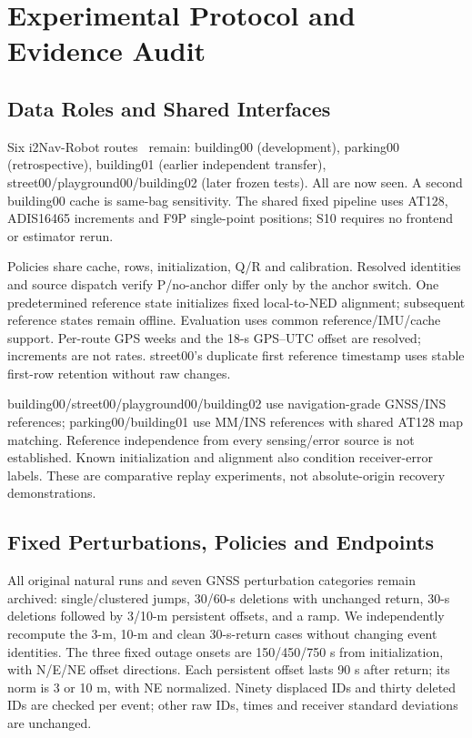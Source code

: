 \documentclass[conference]{IEEEtran}
\begin{document}
\section{Experimental Protocol and Evidence Audit}
\subsection{Data Roles and Shared Interfaces}
Six i2Nav-Robot routes~\cite{i2nav} remain: building00 (development), parking00 (retrospective), building01 (earlier independent transfer), street00/playground00/building02 (later frozen tests). All are now seen. A second building00 cache is same-bag sensitivity. The shared fixed pipeline uses AT128, ADIS16465 increments and F9P single-point positions; S10 requires no frontend or estimator rerun.

Policies share cache, rows, initialization, Q/R and calibration. Resolved identities and source dispatch verify P/no-anchor differ only by the anchor switch. One predetermined reference state initializes fixed local-to-NED alignment; subsequent reference states remain offline. Evaluation uses common reference/IMU/cache support. Per-route GPS weeks and the 18-s GPS--UTC offset are resolved; increments are not rates. street00's duplicate first reference timestamp uses stable first-row retention without raw changes.

building00/street00/playground00/building02 use navigation-grade GNSS/INS references; parking00/building01 use MM/INS references with shared AT128 map matching. Reference independence from every sensing/error source is not established. Known initialization and alignment also condition receiver-error labels. These are comparative replay experiments, not absolute-origin recovery demonstrations.

\subsection{Fixed Perturbations, Policies and Endpoints}
All original natural runs and seven GNSS perturbation categories remain archived: single/clustered jumps, 30/60-s deletions with unchanged return, 30-s deletions followed by 3/10-m persistent offsets, and a ramp. We independently recompute the 3-m, 10-m and clean 30-s-return cases without changing event identities. The three fixed outage onsets are 150/450/750 s from initialization, with N/E/NE offset directions. Each persistent offset lasts 90 s after return; its norm is 3 or 10 m, with NE normalized. Ninety displaced IDs and thirty deleted IDs are checked per event; other raw IDs, times and receiver standard deviations are unchanged.
\end{document}
